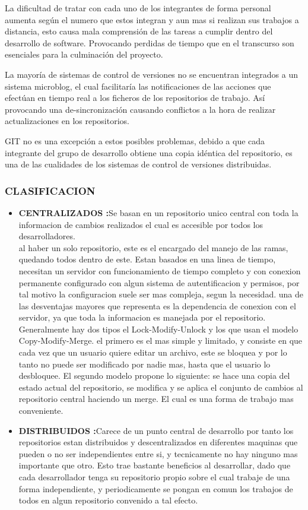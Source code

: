 La dificultad de tratar con cada uno de los integrantes de forma personal aumenta según el numero que estos integran y aun mas si realizan sus trabajos a distancia, esto causa mala comprensión de las tareas a cumplir dentro del desarrollo de software. Provocando perdidas de tiempo que en el transcurso son esenciales para la culminación del proyecto.

La mayoría de sistemas de control de versiones no se encuentran integrados a un sistema microblog, el cual facilitaría las notificaciones de las acciones que efectúan en tiempo real a los ficheros de los repositorios de trabajo. Así provocando una de-sincronización causando conflictos a la hora de realizar actualizaciones en los repositorios.

GIT no es una excepción a estos posibles problemas, debido a que cada integrante del grupo de desarrollo obtiene una copia idéntica del repositorio, es una de las cualidades de los sistemas de control de versiones distribuidas.
\subsubsection{CLASIFICACION}

\begin{itemize}
\item \textbf{CENTRALIZADOS :}Se basan en un repositorio unico central con toda la informacion de cambios realizados el cual es accesible por todos los desarrolladores.\\
al haber un solo repositorio, este es el encargado del manejo de las ramas, quedando todos dentro de este. Estan basados en una linea de tiempo, necesitan un servidor con funcionamiento de tiempo completo y con conexion permanente
configurado con algun sistema de autentificacion y permisos, por tal motivo la configuracion suele ser mas compleja, segun la necesidad. 
una de las desventajas mayores que representa es la dependencia de conexion con el servidor, ya que toda la informacion es manejada por el repositorio. 
Generalmente hay dos tipos el Lock-Modify-Unlock y los que usan el modelo Copy-Modify-Merge. el primero es el mas simple y limitado, y consiste en que cada vez que un usuario quiere editar un archivo, este se bloquea y por lo tanto no puede ser
modificado por nadie mas, hasta que el usuario lo desbloquee. El segundo modelo propone lo siguiente: se hace una copia del estado actual del repositorio, se modifica y se aplica el conjunto de cambios al repositorio central haciendo un merge. El cual es una forma de trabajo mas conveniente.
\item \textbf{DISTRIBUIDOS :}Carece de un punto central de desarrollo por tanto los repositorios estan distribuidos y descentralizados en diferentes maquinas que pueden o no ser independientes entre si, y 
tecnicamente no hay ninguno mas importante que otro. Esto trae bastante beneficios al desarrollar, dado que cada desarrollador tenga su repositorio propio sobre el cual trabaje de una forma independiente, y periodicamente se pongan en comun los trabajos de todos en algun repositorio convenido a tal efecto.

\end{itemize}


